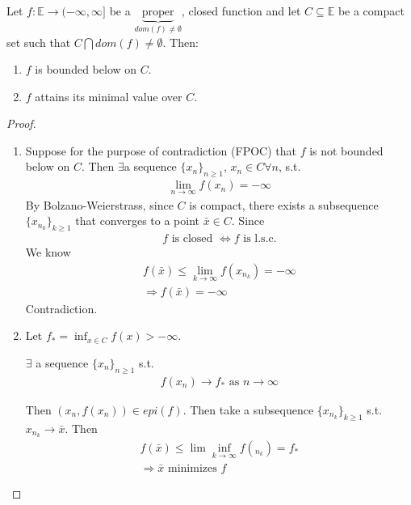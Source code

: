 \documentclass[11pt]{article}
\begin{document}
\begin{theorem}
    Let $f: \mathbb{E}\to (-\infty,\infty]$ be a $\underbrace{\text{proper}}_{dom(f)\neq \emptyset}$,
    closed function and let $C \subseteq \mathbb{E}$ be a compact set such that 
    $C \bigcap dom(f)\neq \emptyset$. Then:
    \begin{enumerate}
        \item $f$ is bounded below on $C$.
        \item $f$ attains its minimal value over $C$.
    \end{enumerate}
\end{theorem}

\begin{proof}
    \begin{enumerate}
        \item Suppose for the purpose of contradiction (FPOC) that $f$ is not bounded below on $C$.
        Then $\exists $a sequence $\{ x_n \}_{n\ge 1}$, $x_n \in C \forall n$, s.t.
        \begin{align*}
            \lim_{n \to \infty}f(x_n) = -\infty
        \end{align*}
        By Bolzano-Weierstrass, since $C$ is compact, there exists a subsequence $\{ x_{n_k} \}_{k\ge 1}$
        that converges to a point $\bar{x} \in C$. Since 
        \begin{align*}
            f \text{ is closed } \iff f \text{ is l.s.c.}
        \end{align*}
        We know 
        \begin{align*}
            f(\bar{x}) \le \lim_{k \to \infty}f(x_{n_k}) = -\infty\\
            \Longrightarrow f(\bar{x}) = -\infty
        \end{align*}
        Contradiction.
        \item Let $f_{*} = \inf_{x \in C} f(x) > -\infty$.
        \begin{claim}
            $\exists $ a sequence $\{ x_n    \}_{n \ge 1}$ s.t.
            \begin{align*}
                f(x_n) \rightarrow f_{*} \text{ as } n\rightarrow\infty
            \end{align*}
        \end{claim}
        Then $(x_n, f(x_n)) \in epi(f)$. Then take a subsequence $\{ x_{n_{k}} \}_{k\ge 1}$ s.t.
        $x_{n_{k}} \rightarrow \bar{x}$. Then
        \begin{align*}
            f(\bar{x}) \le \lim\inf_{k \rightarrow\infty}f(_{n_{k}}) = f_{*}\\
            \Longrightarrow \bar{x} \text{ minimizes } f
        \end{align*}
    \end{enumerate}
\end{proof}
\end{document}
